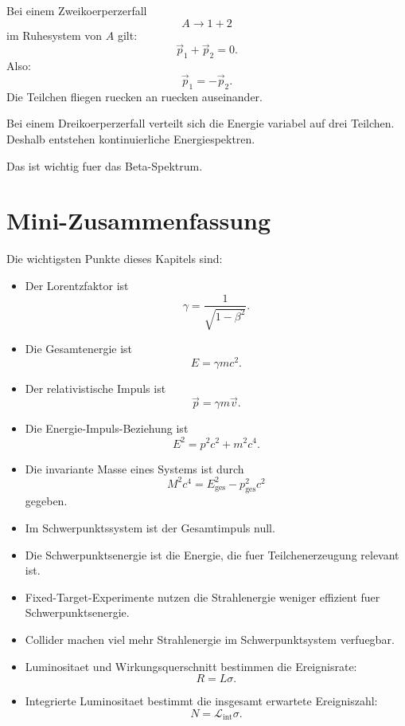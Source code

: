 \begin{examplebox}
Bei einem Zweikoerperzerfall
\[
    A \rightarrow 1+2
\]
im Ruhesystem von $A$ gilt:
\[
    \vec p_1 + \vec p_2 = 0.
\]
Also:
\[
    \vec p_1 = -\vec p_2.
\]
Die Teilchen fliegen ruecken an ruecken auseinander.
\end{examplebox}

\begin{conceptbox}
Bei einem Dreikoerperzerfall verteilt sich die Energie variabel auf drei Teilchen.
Deshalb entstehen kontinuierliche Energiespektren.

Das ist wichtig fuer das Beta-Spektrum.
\end{conceptbox}

\section{Mini-Zusammenfassung}

\begin{notebox}
Die wichtigsten Punkte dieses Kapitels sind:
\begin{itemize}
    \item Der Lorentzfaktor ist
    \[
        \gamma=\frac{1}{\sqrt{1-\beta^2}}.
    \]
    \item Die Gesamtenergie ist
    \[
        E=\gamma mc^2.
    \]
    \item Der relativistische Impuls ist
    \[
        \vec p=\gamma m\vec v.
    \]
    \item Die Energie-Impuls-Beziehung ist
    \[
        E^2=p^2c^2+m^2c^4.
    \]
    \item Die invariante Masse eines Systems ist durch
    \[
        M^2c^4=E_{\mathrm{ges}}^2-p_{\mathrm{ges}}^2c^2
    \]
    gegeben.
    \item Im Schwerpunktssystem ist der Gesamtimpuls null.
    \item Die Schwerpunktsenergie ist die Energie, die fuer Teilchenerzeugung relevant ist.
    \item Fixed-Target-Experimente nutzen die Strahlenergie weniger effizient fuer Schwerpunktsenergie.
    \item Collider machen viel mehr Strahlenergie im Schwerpunktsystem verfuegbar.
    \item Luminositaet und Wirkungsquerschnitt bestimmen die Ereignisrate:
    \[
        R=L\sigma.
    \]
    \item Integrierte Luminositaet bestimmt die insgesamt erwartete Ereigniszahl:
    \[
        N=\mathcal{L}_{\mathrm{int}}\sigma.
    \]
\end{itemize}
\end{notebox}

